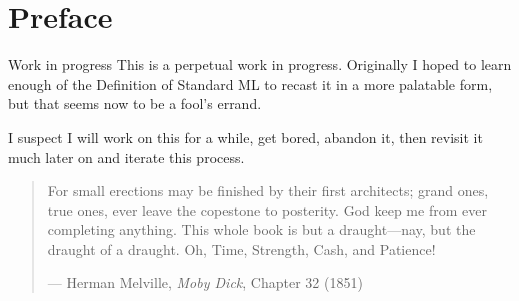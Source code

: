 \chapter{Preface}

\begin{remark}{Work in progress}
This is a perpetual work in progress. Originally I hoped to learn enough
of the Definition of Standard ML to recast it in a more palatable form,
but that seems now to be a fool's errand.

I suspect I will work on this for a while, get bored, abandon it, then
revisit it much later on and iterate this process.

\begin{quote}
For small erections may be finished by their first architects; grand
ones, true ones, ever leave the copestone to posterity. God keep me from
ever completing anything. This whole book is but a draught---nay, but
the draught of a draught. Oh, Time, Strength, Cash, and Patience!

--- Herman Melville, \textit{Moby Dick}, Chapter 32 (1851)
\end{quote}
\end{remark}

\begin{comment}{Commentary or reconstruction?}
This is an attempt to understand the 1997 Revised
Definition~\cite{milner1997definition}, but I am not sure if it should
be a ``rational reconstruction'' (using anachronistic tools and terms to
``build from scratch'' the contents of the definition) or a
``commentary'' (trying to articulate the rather terse text).

Milner and Tofte wrote a commentary~\cite{milner1991commentary} on the
original 1990 Definition~\cite{milner1990definition}.  It's arguable how
similar the two Definitions are to each other. This makes the usefulness
of Milner and Tofte's commentary subject to debate.

I want to be able to reason about Standard ML code with the results of
this document. That's my goal. Towards that end, I suppose I need a
``bit of both''.

\emph{Specifically, this document is geared towards \textbf{understanding}
the Definition.} So I guess that makes it a ``commentary'' after all\dots
\end{comment}

\begin{comment}{``The Definition'' refers to the 1997 definition}
We will stop citing the 1997 Revised
Definition~\cite{milner1997definition} and henceforth refer to it as
``the Definition'' (capitalized). If we want to refer to the 1990
Definition~\cite{milner1990definition}, then we will refer to it as
``the 1990 Definition'' (also capitalized).

When quoting explicitly from the Definition, we will still cite the
bibliography entry, as well as provide the pages found in the printed
version. 
\end{comment}

